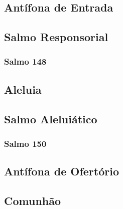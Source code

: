 \subsection{Antífona de Entrada}\label{subsection:tempus-per-annum/sanctissimae-trinitatis/introitus}

\AllowPageFlush

\subsection[Salmo Responsorial]{Salmo Responsorial}\label{subsection:tempus-per-annum/sanctissimae-trinitatis/psalmus-responsorius}
\subsubsection{Salmo 148}

\AllowPageFlush

\subsection{Aleluia}\label{subsection:tempus-per-annum/sanctissimae-trinitatis/alleluia}

\AllowPageFlush

\subsection[Salmo Aleluiático]{Salmo Aleluiático}\label{subsection:tempus-per-annum/sanctissimae-trinitatis/psalmus-alleluiaticus}
\subsubsection{Salmo 150}

\AllowPageFlush

\subsection{Antífona de Ofertório}\label{subsection:tempus-per-annum/sanctissimae-trinitatis/offertorium}

\AllowPageFlush

\subsection{Comunhão}\label{subsection:tempus-per-annum/sanctissimae-trinitatis/communio}

\AllowPageBreak